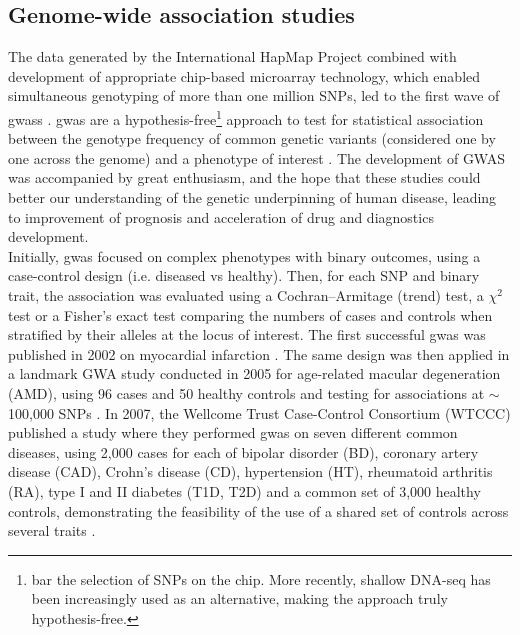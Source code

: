\newpage

\subsection{Genome-wide association studies}
\label{sec:gwas}

The data generated by the International HapMap Project combined with development of appropriate chip-based microarray technology, which enabled simultaneous genotyping of more than one million SNPs, led to the first wave of \glspl{gwas} \cite{visscher2012five}.
\gls{gwas} are a hypothesis-free\footnote{bar the selection of SNPs on the chip. 
More recently, shallow DNA-seq has been increasingly used as an alternative, making the approach truly hypothesis-free.} approach to test for statistical association between the genotype frequency of common genetic variants (considered one by one across the genome) and a phenotype of interest \cite{mccarthy2008genome}. 
The development of GWAS was accompanied by great enthusiasm, and the hope that these studies could better our understanding of the genetic underpinning of human disease, leading to improvement of prognosis and acceleration of drug and diagnostics development. \\

Initially, \gls{gwas} focused on complex phenotypes with binary outcomes, using a case-control design (i.e. diseased vs healthy).
Then, for each SNP and binary trait, the association was evaluated using a Cochran–Armitage (trend) test, a $\chi^2$ test or a Fisher's exact test comparing the numbers of cases and controls when stratified by their alleles at the locus of interest. 
The first successful \gls{gwas} was published in 2002 on myocardial infarction \cite{ozaki2002functional}.
The same design was then applied in a landmark GWA study conducted in 2005 for age-related macular degeneration (AMD), using 96 cases and 50 healthy controls and testing for associations at $\sim$100,000 SNPs \cite{klein2005complement}. 
In 2007, the Wellcome Trust Case-Control Consortium (WTCCC) published a study where they performed \gls{gwas} on seven different common diseases, using 2,000 cases for each of bipolar disorder (BD), coronary artery disease (CAD), Crohn's disease (CD), hypertension (HT), rheumatoid arthritis (RA), type I and II diabetes (T1D, T2D) and a common set of 3,000 healthy controls, demonstrating the feasibility of the use of a shared set of controls across several traits \cite{wellcome2007genome}.\\

